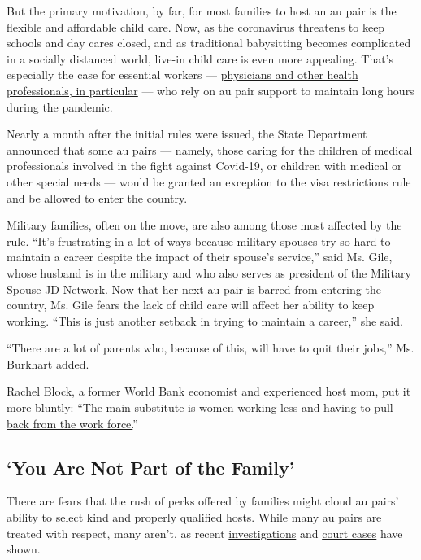 But the primary motivation, by far, for most families to host an au pair
is the flexible and affordable child care. Now, as the coronavirus
threatens to keep schools and day cares closed, and as traditional
babysitting becomes complicated in a socially distanced world, live-in
child care is even more appealing. That's especially the case for
essential workers ---
\href{https://www.nytimes3xbfgragh.onion/2020/03/16/us/coronavirus-doctors-nurses.html}{physicians
and other health professionals, in particular} --- who rely on au pair
support to maintain long hours during the pandemic.

Nearly a month after the initial rules were issued, the State Department
announced that some au pairs --- namely, those caring for the children
of medical professionals involved in the fight against Covid-19, or
children with medical or other special needs --- would be granted an
exception to the visa restrictions rule and be allowed to enter the
country.

Military families, often on the move, are also among those most affected
by the rule. ``It's frustrating in a lot of ways because military
spouses try so hard to maintain a career despite the impact of their
spouse's service,'' said Ms. Gile, whose husband is in the military and
who also serves as president of the Military Spouse JD Network. Now that
her next au pair is barred from entering the country, Ms. Gile fears the
lack of child care will affect her ability to keep working. ``This is
just another setback in trying to maintain a career,'' she said.

``There are a lot of parents who, because of this, will have to quit
their jobs,'' Ms. Burkhart added.

Rachel Block, a former World Bank economist and experienced host mom,
put it more bluntly: ``The main substitute is women working less and
having to
\href{https://www.nytimes3xbfgragh.onion/2020/06/03/business/economy/coronavirus-working-women.html}{pull
back from the work force.}''

\hypertarget{you-are-not-part-of-the-family}{%
\subsection{`You Are Not Part of the
Family'}\label{you-are-not-part-of-the-family}}

There are fears that the rush of perks offered by families might cloud
au pairs' ability to select kind and properly qualified hosts. While
many au pairs are treated with respect, many aren't, as recent
\href{https://www.politico.com/magazine/story/2017/03/au-pair-program-abuse-state-department-214956}{investigations}
and
\href{https://www.nytimes3xbfgragh.onion/2020/01/08/us/au-pair-massachusetts-ruling.html}{court
cases} have shown.

